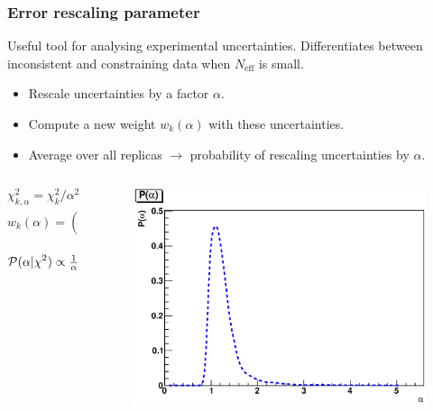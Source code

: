 \documentclass[10pt]{beamer}
\newcommand{\be}{\begin{equation*}}
\newcommand{\ee}{\end{equation*}}
\def\smallfrac#1#2{\hbox{${{#1}\over {#2}}$}}
\begin{document}
\begin{frame}
\frametitle{Error rescaling parameter}
Useful tool for analysing experimental uncertainties. 
Differentiates between inconsistent and constraining data when $N_{\mathrm{eff}}$ is small.
\begin{itemize}
		\item<1-> Rescale uncertainties by a factor $\alpha$.
		\item<1-> Compute a new weight $w_k(\alpha)$ with these uncertainties.
		\item<1-> Average over all replicas $\to$ probability of rescaling uncertainties by $\alpha$.
\end{itemize}


\begin{columns}
  \begin{column}{0.5\textwidth}
  \begin{block}{}
\be \chi^2_{k,\alpha} = \chi^2_k/\alpha^2, \ee
\be w_k(\alpha) = (\chi^2_{k,\alpha})^{(n-1)/2}\mathrm{e}^{-\chi^2_{k,\alpha}/2,}\ee
\be \mathcal{P}(\alpha | \chi^2)\propto \smallfrac{1}{\alpha}\sum_{k=1}^N w_k(\alpha).\ee
\end{block}
  \end{column}
  
    \begin{column}{0.5\textwidth}
 \begin{figure}[b!]
    \begin{center}
      \includegraphics[width=1\textwidth]{figures/palpha-jets-t0.eps}
    \end{center}
\end{figure}

  \end{column}  
  \end{columns}

\begin{figure}[b!]
    \begin{center}
    \end{center}
    \vskip-0.5cm

\end{figure}

\end{frame}



\end{document}
